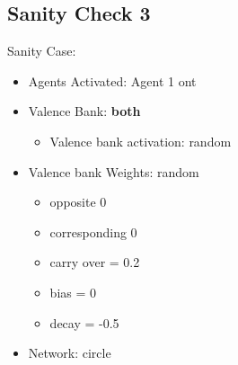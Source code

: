 \documentclass{article}\usepackage[]{graphicx}\usepackage[]{color}
\begin{document}
\subsection{Sanity Check 3}
\label{sec:sanity3}
Sanity Case:
\begin{itemize}
  \item Agents Activated: Agent 1 ont
  \item Valence Bank: \textbf{both}
  \begin{itemize}
      \item Valence bank activation: random
  \end{itemize}
  \item Valence bank Weights: random
  \begin{itemize}
      \item opposite 0
      \item corresponding 0
      \item carry over = 0.2
      \item bias = 0
      \item decay = -0.5
  \end{itemize}
  \item Network: circle
\end{itemize}
%
%

\newpage
\end{document}
